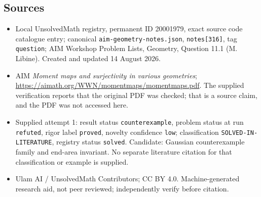 \documentclass[11pt]{article}
\begin{document}
\subsection{Sources}
\begin{itemize}
\item Local UnsolvedMath registry, permanent ID 20001979, exact source code catalogue entry; canonical \texttt{aim-geometry-notes.json}, \texttt{notes[316]}, tag \texttt{question}; AIM Workshop Problem Lists, Geometry, Question 11.1 (M. Libine). Created and updated 14 August 2026.
\item AIM \emph{Moment maps and surjectivity in various geometries}; \url{https://aimath.org/WWN/momentmaps/momentmaps.pdf}. The supplied verification reports that the original PDF was checked; that is a source claim, and the PDF was not accessed here.
\item Supplied attempt 1: result status \texttt{counterexample}, problem status at run \texttt{refuted}, rigor label \texttt{proved}, novelty confidence \texttt{low}; classification \texttt{SOLVED-IN-LITERATURE}, registry status \texttt{solved}. Candidate: Gaussian counterexample family and end-area invariant. No separate literature citation for that classification or example is supplied.
\item Ulam AI / UnsolvedMath Contributors; CC BY 4.0. Machine-generated research aid, not peer reviewed; independently verify before citation.
\end{itemize}
\end{document}
